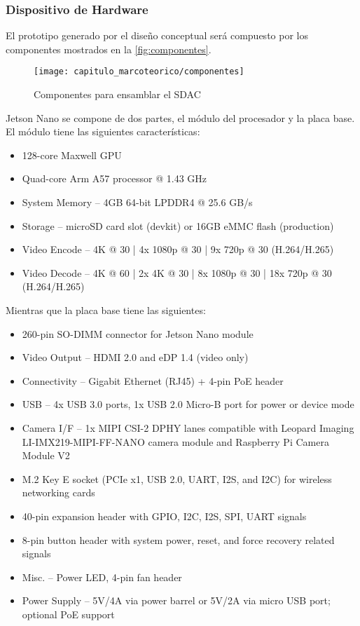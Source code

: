 \subsubsection{Dispositivo de Hardware}

El prototipo generado por el diseño conceptual será compuesto por los
componentes mostrados en la \autoref{fig:componentes}.

\begin{figure}[H]
    \centering
    \texttt{[image: capitulo\_marcoteorico/componentes]}
    \caption{Componentes para ensamblar el SDAC}\label{fig:componentes}
\end{figure}

Jetson Nano se compone de dos partes, el módulo del procesador y la placa base.
El módulo tiene las siguientes características:

\begin{itemize}
    \item 128-core Maxwell GPU
    \item Quad-core Arm A57 processor @ 1.43 GHz
    \item System Memory  – 4GB 64-bit LPDDR4 @ 25.6 GB/s
    \item Storage  – microSD card slot (devkit) or 16GB eMMC flash (production)
    \item Video Encode – 4K @ 30 | 4x 1080p @ 30 | 9x 720p @ 30 (H.264/H.265)
    \item Video Decode – 4K @ 60 | 2x 4K @ 30 | 8x 1080p @ 30 | 18x 720p @ 30
    (H.264/H.265)
\end{itemize}

Mientras que la placa base tiene las siguientes:

\begin{itemize}
    \item 260-pin SO-DIMM connector for Jetson Nano module
    \item Video Output – HDMI 2.0 and eDP 1.4 (video only)
    \item Connectivity – Gigabit Ethernet (RJ45) + 4-pin PoE header
    \item USB – 4x USB 3.0 ports, 1x USB 2.0 Micro-B port for power or device
    mode
    \item Camera I/F – 1x MIPI CSI-2 DPHY lanes compatible with Leopard Imaging
    LI-IMX219-MIPI-FF-NANO camera module and Raspberry Pi Camera Module V2
    \item M.2 Key E socket (PCIe x1, USB 2.0, UART, I2S, and I2C) for wireless
    networking cards
    \item 40-pin expansion header with GPIO, I2C, I2S, SPI, UART signals
    \item 8-pin button header with system power, reset, and force recovery
    related signals
    \item Misc. – Power LED, 4-pin fan header
    \item Power Supply – 5V/4A via power barrel or 5V/2A via micro USB port;
    optional PoE support
\end{itemize}

